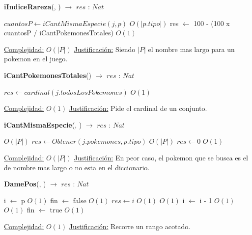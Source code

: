 \begin{algorithm}[H]{\textbf{iIndiceRareza}(, )  $\to$ $res$ : $Nat$} 
	{}
	\begin{algorithmic}
		\State $cuantosP \gets iCantMismaEspecie(j, p) $ \Comment $O(|p.tipo|)$
		\State res $\gets$ 100 - (100 x cuantosP / iCantPokemonesTotales)  \Comment $O(1)$
	
		\medskip
		\Statex \underline{Complejidad:} $O(|P|)$
		\Statex \underline{Justificación:} Siendo $|P|$ el nombre mas largo para un pokemon en el juego.
    \end{algorithmic}
\end{algorithm}

\begin{algorithm}[H]{\textbf{iCantPokemonesTotales}() $\to$ $res$ : $Nat$} 
	{}
	\begin{algorithmic}
		\State $res \gets cardinal(j.todosLosPokemones) $ \Comment $O(1)$
	
		\medskip
		\Statex \underline{Complejidad:} $O(1)$
		\Statex \underline{Justificación:} Pide el cardinal de un conjunto.
    \end{algorithmic}
\end{algorithm}

\begin{algorithm}[H]{\textbf{iCantMismaEspecie}(, ) $\to$ $res$ : $Nat$} 
	{}
	\begin{algorithmic}
		 \Comment $O(|P|)$
		\State $res \gets Obtener(j.pokemones, p.tipo)$ \Comment $O(|P|)$
		\Else
		\State $res \gets 0 $ \Comment $O(1)$
		\EndIf
	
		\medskip
		\Statex \underline{Complejidad:} $O(|P|)$
		\Statex \underline{Justificación:} En peor caso, el pokemon que se busca es el de nombre mas largo o no esta en el diccionario.
    \end{algorithmic}
\end{algorithm}

\begin{algorithm}[H]{\textbf{DamePos}(, ) $\to$ $res$ : $Nat$} 
	{}
	\begin{algorithmic}
		\State i $\gets$ p	\Comment $O(1)$
		\State fin $\gets$ false	\Comment $O(1)$
		\State $res \gets i$	\Comment $O(1)$
			\Comment $O(1)$
			\State i $\gets$ i - 1	\Comment $O(1)$
				\Comment $O(1)$
				\State fin $\gets$ true	\Comment $O(1)$
			\EndIf
		\EndWhile
	
		\medskip
		\Statex \underline{Complejidad:} $O(1)$
		\Statex \underline{Justificación:} Recorre un rango acotado.
    \end{algorithmic}
\end{algorithm}